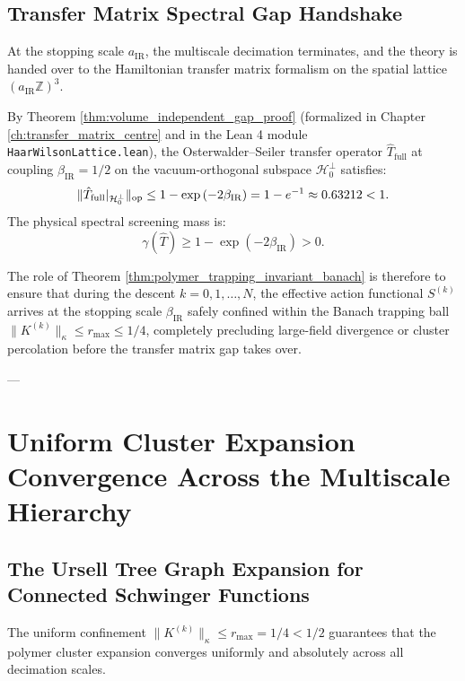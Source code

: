 \subsection{Transfer Matrix Spectral Gap Handshake}
\label{subsec:handshake_spectral_gap}

At the stopping scale $a_{\mathrm{IR}}$, the multiscale decimation terminates, and the theory is handed over to the Hamiltonian transfer matrix formalism on the spatial lattice $(a_{\mathrm{IR}} \mathbb{Z})^3$.

By Theorem \ref{thm:volume_independent_gap_proof} (formalized in Chapter \ref{ch:transfer_matrix_centre} and in the Lean 4 module \texttt{HaarWilsonLattice.lean}), the Osterwalder--Seiler transfer operator $\hat{T}_{\mathrm{full}}$ at coupling $\beta_{\mathrm{IR}} = 1/2$ on the vacuum-orthogonal subspace $\mathcal{H}_0^\perp$ satisfies:
\begin{equation}
\label{eq:ch14_handshake_gap}
\|\hat{T}_{\mathrm{full}}|_{\mathcal{H}_0^\perp}\|_{\mathrm{op}} \le 1 - \exp\left( -2 \beta_{\mathrm{IR}} \right) = 1 - e^{-1} \approx 0.63212 < 1.
\end{equation}
The physical spectral screening mass is:
\begin{equation}
\gamma(\hat{T}) \ge 1 - \exp\left( -2 \beta_{\mathrm{IR}} \right) > 0.
\end{equation}

The role of Theorem \ref{thm:polymer_trapping_invariant_banach} is therefore to ensure that during the descent $k = 0, 1, \dots, N$, the effective action functional $S^{(k)}$ arrives at the stopping scale $\beta_{\mathrm{IR}}$ safely confined within the Banach trapping ball $\|K^{(k)}\|_\kappa \le r_{\max} \le 1/4$, completely precluding large-field divergence or cluster percolation before the transfer matrix gap takes over.

---

\section{Uniform Cluster Expansion Convergence Across the Multiscale Hierarchy}
\label{sec:cluster_convergence}

\subsection{The Ursell Tree Graph Expansion for Connected Schwinger Functions}
\label{subsec:ursell_tree_expansion}

The uniform confinement $\|K^{(k)}\|_\kappa \le r_{\max} = 1/4 < 1/2$ guarantees that the polymer cluster expansion converges uniformly and absolutely across all decimation scales.

